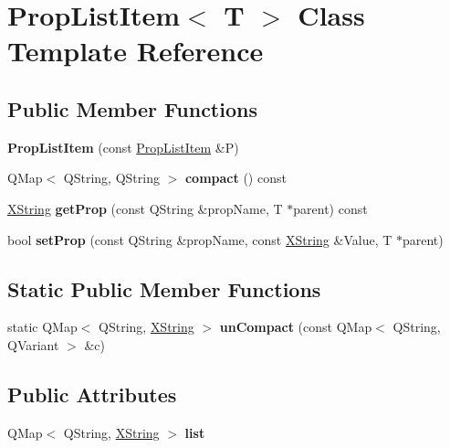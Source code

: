 \hypertarget{class_prop_list_item}{}\section{Prop\+List\+Item$<$ T $>$ Class Template Reference}
\label{class_prop_list_item}
\subsection*{Public Member Functions}
\begin{DoxyCompactItemize}
\item 
\mbox{\label{class_prop_list_item_a2e51daa351464f8aa612b453642ce93f}} 
{\bfseries Prop\+List\+Item} (const \hyperlink{class_prop_list_item}{Prop\+List\+Item} \&P)
\item 
\mbox{\label{class_prop_list_item_a1252fb7d4d4e60e23c2d653c4a95e807}} 
Q\+Map$<$ Q\+String, Q\+String $>$ {\bfseries compact} () const
\item 
\mbox{\label{class_prop_list_item_af5f456255c47c2b796fbcb134ed4187b}} 
\hyperlink{class_x_string}{X\+String} {\bfseries get\+Prop} (const Q\+String \&prop\+Name, T $\ast$parent) const
\item 
\mbox{\label{class_prop_list_item_af43304dfe0469ad8f8da6f6f1fd273f5}} 
bool {\bfseries set\+Prop} (const Q\+String \&prop\+Name, const \hyperlink{class_x_string}{X\+String} \&Value, T $\ast$parent)
\end{DoxyCompactItemize}
\subsection*{Static Public Member Functions}
\begin{DoxyCompactItemize}
\item 
\mbox{\label{class_prop_list_item_ac0e09056c7ef56128b2975e10bb26038}} 
static Q\+Map$<$ Q\+String, \hyperlink{class_x_string}{X\+String} $>$ {\bfseries un\+Compact} (const Q\+Map$<$ Q\+String, Q\+Variant $>$ \&c)
\end{DoxyCompactItemize}
\subsection*{Public Attributes}
\begin{DoxyCompactItemize}
\item 
\mbox{\label{class_prop_list_item_a7568171cfae638817ee68e1fb0013d6f}} 
Q\+Map$<$ Q\+String, \hyperlink{class_x_string}{X\+String} $>$ {\bfseries list}
\end{DoxyCompactItemize}



